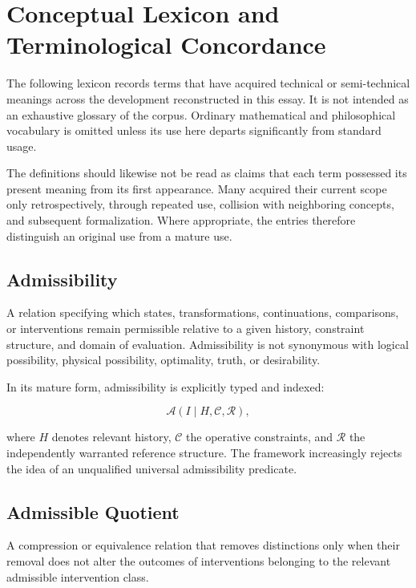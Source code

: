 \documentclass[11pt]{article}
\theoremstyle{remark}
\newcommand{\Adm}{\mathcal{A}}
\begin{document}
\appendix

\section{Conceptual Lexicon and Terminological Concordance}

The following lexicon records terms that have acquired technical or
semi-technical meanings across the development reconstructed in this essay.
It is not intended as an exhaustive glossary of the corpus. Ordinary
mathematical and philosophical vocabulary is omitted unless its use here
departs significantly from standard usage.

The definitions should likewise not be read as claims that each term possessed
its present meaning from its first appearance. Many acquired their current
scope only retrospectively, through repeated use, collision with neighboring
concepts, and subsequent formalization. Where appropriate, the entries
therefore distinguish an original use from a mature use.

\subsection*{Admissibility}

A relation specifying which states, transformations, continuations, comparisons,
or interventions remain permissible relative to a given history, constraint
structure, and domain of evaluation. Admissibility is not synonymous with
logical possibility, physical possibility, optimality, truth, or desirability.

In its mature form, admissibility is explicitly typed and indexed:

\[
\Adm(I\mid H,\mathcal{C},\mathcal{R}),
\]

where $H$ denotes relevant history, $\mathcal{C}$ the operative constraints,
and $\mathcal{R}$ the independently warranted reference structure. The
framework increasingly rejects the idea of an unqualified universal
admissibility predicate.

\subsection*{Admissible Quotient}

A compression or equivalence relation that removes distinctions only when
their removal does not alter the outcomes of interventions belonging to the
relevant admissible intervention class.
\end{document}
